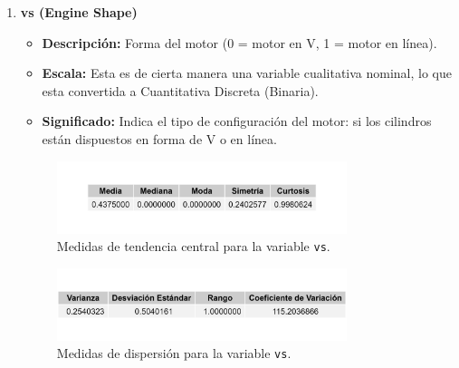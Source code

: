 \documentclass{article}
\begin{document}
\begin{enumerate}
	\item \textbf{vs (Engine Shape)}

	      \begin{itemize}
		      \item \textbf{Descripción:} Forma del motor (0 = motor en V, 1 = motor en línea).
		      \item \textbf{Escala:}  Esta es de cierta manera una variable cualitativa nominal, lo que esta convertida a Cuantitativa Discreta (Binaria).
		      \item \textbf{Significado:} Indica el tipo de configuración del motor: si los cilindros están dispuestos en forma de V o en línea.
	      \end{itemize}


	      \begin{figure}[H]
		      \centering
		      \includegraphics[width=0.8\textwidth]{MTC/vs_central.png}
		      \caption{Medidas de tendencia central para la variable \texttt{vs}.}
		      \label{fig:vs_central}
	      \end{figure}

	      \begin{figure}[H]
		      \centering
		      \includegraphics[width=0.8\textwidth]{MTC/vs_dispersion.png}
		      \caption{Medidas de dispersión para la variable \texttt{vs}.}
		      \label{fig:vs_dispersion}
	      \end{figure}
	    

\end{enumerate}
\end{document}
